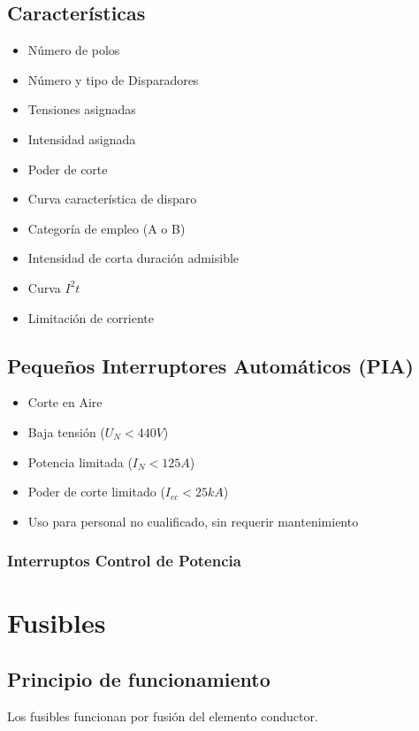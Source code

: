 \subsection{Características}
\begin{itemize}
    \item Número de polos
    \item Número y tipo de Disparadores
    \item Tensiones asignadas
    \item Intensidad asignada
    \item Poder de corte
    \item Curva característica de disparo
    \item Categoría de empleo (A o B)
    \item Intensidad de corta duración admisible
    \item Curva $I^2t$
    \item Limitación de corriente
\end{itemize}

\subsection{Pequeños Interruptores Automáticos (PIA)}
\begin{itemize}
    \item Corte en Aire
    \item Baja tensión ($U_N < 440 V$)
    \item Potencia limitada ($I_N < 125 A$)
    \item Poder de corte limitado ($I_{cc} < 25 kA$)
    \item Uso para personal no cualificado, sin requerir mantenimiento
\end{itemize}

\subsubsection{Interruptos Control de Potencia}

\section{Fusibles}
\subsection{Principio de funcionamiento}
Los fusibles funcionan por fusión del elemento conductor.

